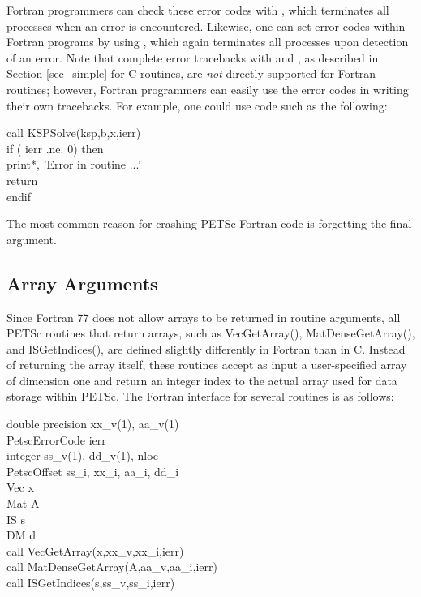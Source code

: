 Fortran programmers
can check these error codes with
, which terminates all processes when an error is
encountered.  Likewise, one can set error codes within Fortran programs by
using , which again terminates all processes
upon detection of an error.
Note that complete error tracebacks with
 and , as described in Section
\ref{sec_simple} for C routines, are {\em not} directly supported for
Fortran routines; however, Fortran programmers can easily use the
error codes in writing their own tracebacks.  For example, one could
use code such as the following:
\begin{tabbing}
   call KSPSolve(ksp,b,x,ierr)\\
   if ( ierr .ne. 0) then\\
       print*, 'Error in routine ...'\\
       return\\
   endif
\end{tabbing}

The most common reason for crashing PETSc Fortran code is forgetting the
final  argument.

\subsection{Array Arguments}
\label{sec_fortranarrays}

Since Fortran 77 does not allow arrays to be returned in routine
arguments, all PETSc routines that return arrays, such as
VecGetArray(), MatDenseGetArray(),
and ISGetIndices(), 
are defined slightly differently in Fortran than in C.
Instead of returning the array itself, these routines
accept as input a user-specified array of dimension one and return an
integer index to the actual array used for data storage within PETSc.
The Fortran interface for several routines is as follows:
\begin{tabbing}
   double precision xx\_v(1), aa\_v(1)\\
   PetscErrorCode ierr\\
   integer          ss\_v(1), dd\_v(1), nloc\\
   PetscOffset      ss\_i, xx\_i, aa\_i, dd\_i\\
   Vec x\\
   Mat A\\
   IS  s\\
   DM  d \\

   call VecGetArray(x,xx\_v,xx\_i,ierr)\\
   call MatDenseGetArray(A,aa\_v,aa\_i,ierr)\\
   call ISGetIndices(s,ss\_v,ss\_i,ierr)\\
\end{tabbing}

